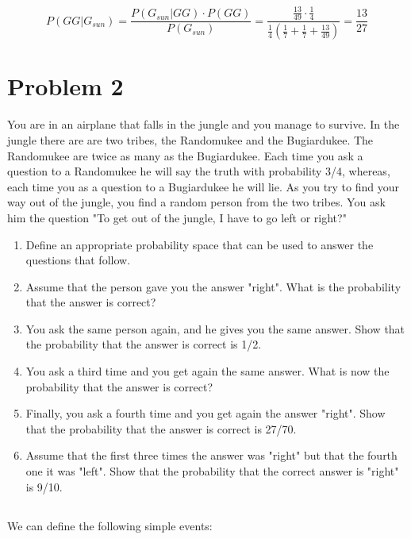 \documentclass{article}
\begin{document}
\begin{equation} \label{eq:bayes4}
P(GG | G_{sun}) = \frac {P(G_{sun} | GG) \cdot P(GG)} {P(G_{sun})}  = \frac { \frac {13} {49} \cdot \frac {1}{4} } { \frac{1}{4} ( \frac {1}{7} + \frac {1}{7} + \frac {13}{49}) } = \frac {13} {27}
\end{equation}






\section{Problem 2}
You are in an airplane that falls in the jungle and you manage to survive. In the jungle there are are two tribes, the Randomukee and the Bugiardukee. The Randomukee are twice as many as the Bugiardukee. Each time you ask a question to a Randomukee he will say the truth with probability 3/4, whereas, each time you as a question to a Bugiardukee he will lie. As you try to find your way out of the jungle, you find a random person from the two tribes. You ask him the question "To get out of the jungle, I have to go left or right?"
\begin{enumerate}
    \item Define an appropriate probability space that can be used to answer the questions that follow.
    \item Assume that the person gave you the answer "right". What is the probability that the answer is correct?
    \item You ask the same person again, and he gives you the same answer. Show that the probability that the answer is correct is 1/2.
    \item You ask a third time and you get again the same answer. What is now the probability that the answer is correct?
    \item Finally, you ask a fourth time and you get again the answer "right". Show that the probability that the answer is correct is 27/70.
    \item Assume that the first three times the answer was "right" but that the fourth one it was "left". Show that the probability that the correct answer is "right" is 9/10.
\end{enumerate}

\subsection{}

We can define the following simple events:
\end{document}
